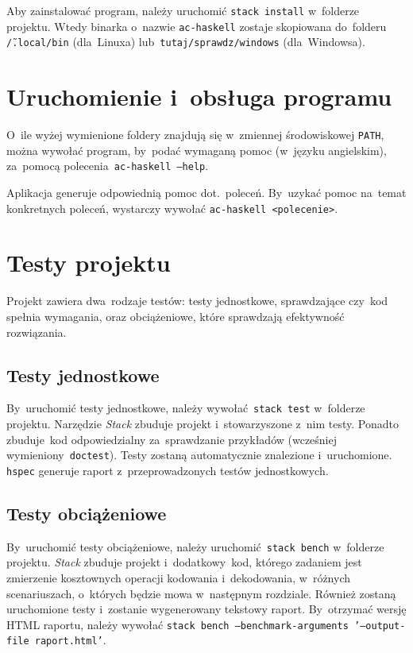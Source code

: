 \documentclass[../../praca.tex]{subfiles}
\begin{document}
Aby zainstalować program, należy uruchomić \texttt{stack install} 
w~folderze projektu. Wtedy binarka o~nazwie \texttt{ac-haskell}
zostaje skopiowana do~folderu \texttt{\~/.local/bin} (dla~Linuxa)
lub~\texttt{tutaj/sprawdz/windows} (dla~Windowsa).

\section{Uruchomienie i~obsługa programu}

O~ile wyżej wymienione foldery znajdują się w~zmiennej środowiskowej
\texttt{PATH}, można wywołać program, by~podać wymaganą pomoc (w~języku angielskim),
za~pomocą polecenia~\texttt{ac-haskell --help}.

Aplikacja generuje odpowiednią pomoc dot.~poleceń. By~uzykać pomoc na~temat konkretnych
poleceń, wystarczy wywołać \texttt{ac-haskell <polecenie>}.

\section{Testy projektu}

Projekt zawiera dwa~rodzaje testów: testy jednostkowe, sprawdzające
czy~kod spełnia wymagania, oraz obciążeniowe, które sprawdzają
efektywność rozwiązania.

\subsection{Testy jednostkowe}

By~uruchomić testy jednostkowe, należy wywołać~\texttt{stack test}
w~folderze projektu. Narzędzie \emph{Stack} zbuduje projekt
i~stowarzyszone z~nim testy. Ponadto zbuduje~kod
odpowiedzialny za~sprawdzanie przykładów (wcześniej
wymieniony~\texttt{doctest}). Testy zostaną automatycznie
znalezione i~uruchomione. \texttt{hspec} 
generuje raport z~przeprowadzonych testów jednostkowych.

\subsection{Testy obciążeniowe}

By~uruchomić testy obciążeniowe, należy uruchomić~\texttt{stack bench}
w~folderze projektu. \emph{Stack} zbuduje projekt
i~dodatkowy~kod, którego zadaniem jest zmierzenie
kosztownych operacji kodowania i~dekodowania,
w~różnych scenariuszach, o~których będzie mowa
w~następnym rozdziale. Również zostaną uruchomione
testy i~zostanie wygenerowany tekstowy raport. 
By~otrzymać wersję HTML raportu, należy wywołać
\texttt{stack bench --benchmark-arguments '--output-file raport.html'}.
\end{document}
